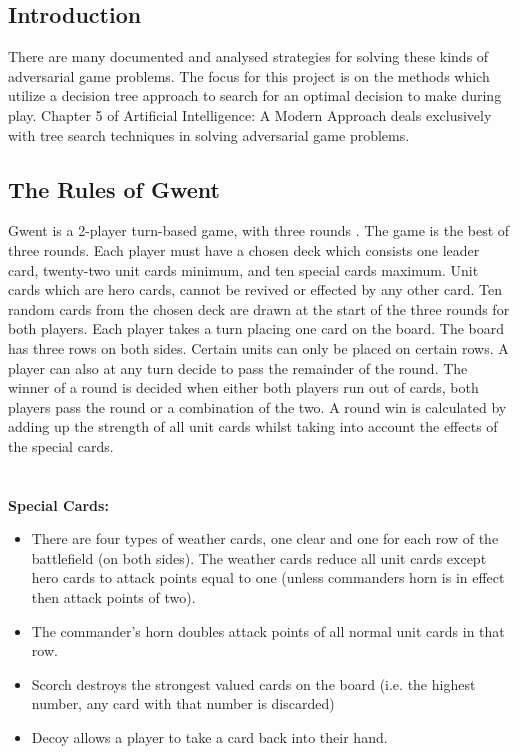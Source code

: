 \documentclass [11pt]{article}
\begin{document}
	\subsection{Introduction}
	There are many documented and analysed strategies for solving these kinds of adversarial game problems. The focus for this project is on the methods which utilize a decision tree approach to search for an optimal decision to make during play. Chapter 5 of Artificial Intelligence: A Modern Approach \cite{AIModern} deals exclusively with tree search techniques in solving adversarial game problems.
	
	\subsection{The Rules of Gwent}
	Gwent is a 2-player turn-based game, with three rounds \cite{guide}. The game is the best of three rounds. Each player must have a chosen deck which consists one leader card, twenty-two unit cards minimum, and ten special cards maximum. Unit cards which are hero cards, cannot be revived or effected by any other card. Ten random cards from the chosen deck are drawn at the start of the three rounds for both players. Each player takes a turn placing one card on the board. The board has three rows on both sides. Certain units can only be placed on certain rows. A player can also at any turn decide to pass the remainder of the round. The winner of a round is decided when either both players run out of cards, both players pass the round or a combination of the two. A round win is calculated by adding up the strength of all unit cards whilst taking into account the effects of the special cards.
	\\\\\\
	\noindent \textbf{Special Cards:}
	
	\begin{itemize}
		\item There are four types of weather cards, one clear and one for each row of the battlefield (on both sides). The weather cards reduce all unit cards except hero cards to attack points equal to one (unless commanders horn is in effect then attack points of two).
		\item The commander's horn doubles attack points of all normal unit cards in that row.
		\item Scorch destroys the strongest valued cards on the board (i.e. the highest number, any card with that number is discarded)
		\item Decoy allows a player to take a card back into their hand.
	\end{itemize}
	
\end{document}
